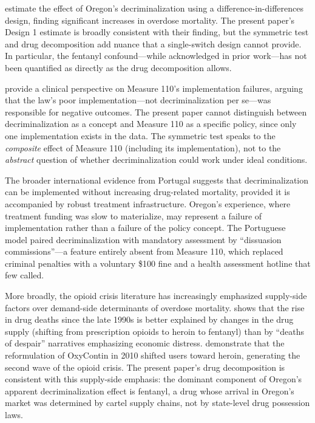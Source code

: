 \documentclass[12pt]{article}
\begin{document}
\citet{dave2023effects} estimate the effect of Oregon's decriminalization using a difference-in-differences design, finding significant increases in overdose mortality. The present paper's Design 1 estimate is broadly consistent with their finding, but the symmetric test and drug decomposition add nuance that a single-switch design cannot provide. In particular, the fentanyl confound---while acknowledged in prior work---has not been quantified as directly as the drug decomposition allows.

\citet{mcginty2023decriminalization} provide a clinical perspective on Measure 110's implementation failures, arguing that the law's poor implementation---not decriminalization per se---was responsible for negative outcomes. The present paper cannot distinguish between decriminalization as a concept and Measure 110 as a specific policy, since only one implementation exists in the data. The symmetric test speaks to the \textit{composite} effect of Measure 110 (including its implementation), not to the \textit{abstract} question of whether decriminalization could work under ideal conditions.

The broader international evidence from Portugal \citep{hughes2010portuguese} suggests that decriminalization can be implemented without increasing drug-related mortality, provided it is accompanied by robust treatment infrastructure. Oregon's experience, where treatment funding was slow to materialize, may represent a failure of implementation rather than a failure of the policy concept. The Portuguese model paired decriminalization with mandatory assessment by ``dissuasion commissions''---a feature entirely absent from Measure 110, which replaced criminal penalties with a voluntary \$100 fine and a health assessment hotline that few called.

More broadly, the opioid crisis literature has increasingly emphasized supply-side factors over demand-side determinants of overdose mortality. \citet{ruhm2019drivers} shows that the rise in drug deaths since the late 1990s is better explained by changes in the drug supply (shifting from prescription opioids to heroin to fentanyl) than by ``deaths of despair'' narratives emphasizing economic distress. \citet{alpert2018supply} demonstrate that the reformulation of OxyContin in 2010 shifted users toward heroin, generating the second wave of the opioid crisis. The present paper's drug decomposition is consistent with this supply-side emphasis: the dominant component of Oregon's apparent decriminalization effect is fentanyl, a drug whose arrival in Oregon's market was determined by cartel supply chains, not by state-level drug possession laws.
\end{document}
